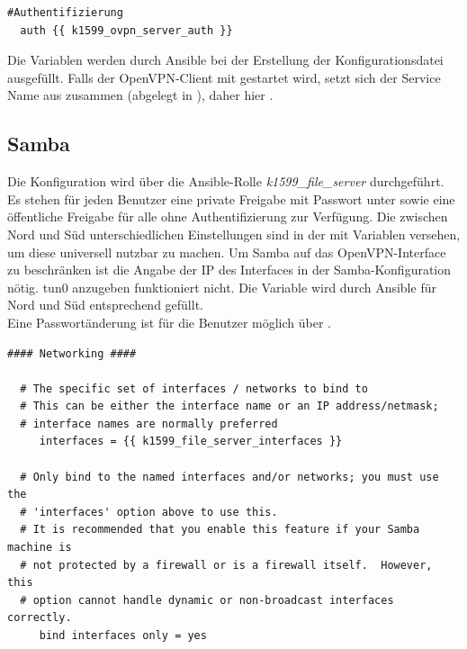 \begin{lstlisting}[label=code:authmethod,caption=Authentifizierungsmethode]
  #Authentifizierung
  auth {{ k1599_ovpn_server_auth }}
\end{lstlisting}

Die Variablen  werden durch Ansible bei der Erstellung der Konfigurationsdatei ausgefüllt. Falls der OpenVPN-Client mit  gestartet wird, setzt sich der Service Name aus  zusammen (abgelegt in ), daher hier .

\subsection{Samba}
Die Konfiguration wird über die Ansible-Rolle \textit{k1599\_file\_server} durchgeführt. Es stehen für jeden Benutzer eine private Freigabe mit Passwort unter  sowie eine öffentliche Freigabe  für alle ohne Authentifizierung zur Verfügung. Die zwischen Nord und Süd unterschiedlichen Einstellungen sind in der  mit Variablen versehen, um diese universell nutzbar zu machen. Um Samba auf das OpenVPN-Interface zu beschränken ist die Angabe der IP des Interfaces in der Samba-Konfiguration nötig. tun0 anzugeben funktioniert nicht. Die Variable wird durch Ansible für Nord und Süd entsprechend gefüllt.\\

Eine Passwortänderung ist für die Benutzer möglich über
.

\begin{lstlisting}[label=code:smbconf1,caption=Ausschnitt aus /etc/samba/smb.conf]
  #### Networking ####

  # The specific set of interfaces / networks to bind to
  # This can be either the interface name or an IP address/netmask;
  # interface names are normally preferred
     interfaces = {{ k1599_file_server_interfaces }}

  # Only bind to the named interfaces and/or networks; you must use the
  # 'interfaces' option above to use this.
  # It is recommended that you enable this feature if your Samba machine is
  # not protected by a firewall or is a firewall itself.  However, this
  # option cannot handle dynamic or non-broadcast interfaces correctly.
     bind interfaces only = yes
\end{lstlisting}

